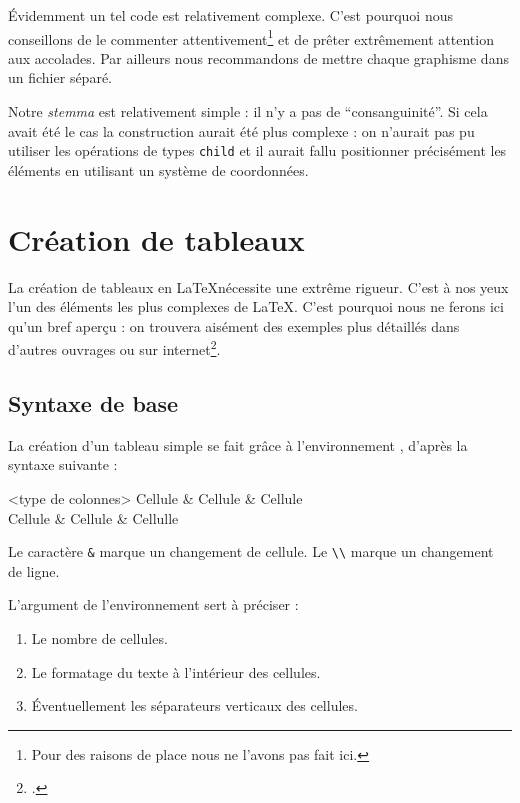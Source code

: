 Évidemment un tel code est relativement complexe. C'est pourquoi nous conseillons de le commenter attentivement\footnote{Pour des raisons de place nous ne l'avons pas fait ici.} et de prêter extrêmement attention  aux accolades. Par ailleurs nous recommandons de mettre chaque graphisme  dans un fichier séparé.


Notre \emph{stemma} est relativement simple : il n'y a pas de \enquote{consanguinité}. Si cela avait été le cas la construction aurait été plus complexe : on n'aurait pas pu utiliser les opérations de types \verb|child| et il aurait fallu positionner précisément les éléments en utilisant un système de coordonnées.



\section{Création de tableaux}

\begin{attention}
La création de tableaux en \LaTeX nécessite  une extrême rigueur. 
C'est à nos yeux l'un des éléments les plus complexes de \LaTeX. C'est pourquoi nous ne ferons ici qu'un bref aperçu : on trouvera aisément des exemples plus détaillés dans d'autres ouvrages ou sur internet\footcite[On pourra consulter des fichiers assez didactiques :][]{bebert_tableaux}.
\end{attention}

\subsection{Syntaxe de base}

La création d'un tableau simple se fait grâce à l'environnement , d'après la syntaxe suivante :

\begin{latexcode}
\begin{tabular}{<type de colonnes>}
    Cellule & Cellule & Cellule \\
    Cellule & Cellule & Cellulle \\
\end{tabular}
\end{latexcode}

Le caractère \verb|&| marque un changement de cellule. Le \verb|\\| marque un changement de ligne.

L'argument  de l'environnement  sert à préciser :
\begin{enumerate}
    \item Le nombre de cellules.
    \item Le formatage du texte à l'intérieur des cellules.
    \item Éventuellement les séparateurs verticaux des cellules.
    
\end{enumerate}

